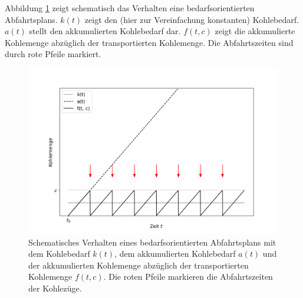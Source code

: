 Abbildung \ref{fig:demand-math} zeigt schematisch das Verhalten eine bedarfsorientierten Abfahrtsplans. $k(t)$ zeigt den (hier zur Vereinfachung konstanten) Kohlebedarf. $a(t)$ stellt den akkumulierten Kohlebedarf dar. $f(t,c)$ zeigt die akkumulierte Kohlemenge abzüglich der transportierten Kohlemenge. Die Abfahrtszeiten sind durch rote Pfeile markiert.

\begin{figure}[H]
	\centering
	\includegraphics[width=1.0\linewidth]{images/demand-math.png}
	\caption{Schematisches Verhalten eines bedarfsorientierten Abfahrtsplans mit dem Kohlebedarf $k(t)$, dem akkumulierten Kohlebedarf $a(t)$ und der akkumulierten Kohlemenge abzüglich der transportierten Kohlemenge $f(t,c)$. Die roten Pfeile markieren die Abfahrtszeiten der Kohlezüge.}
	\label{fig:demand-math}
\end{figure}